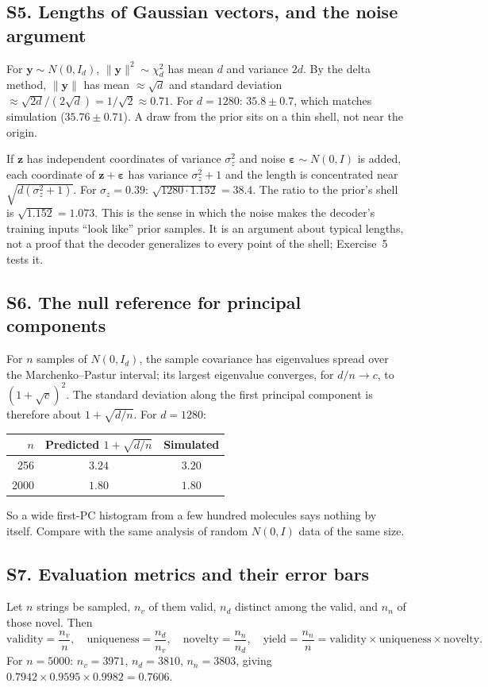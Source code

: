 \documentclass[11pt]{article}
\begin{document}
\subsection*{S5. Lengths of Gaussian vectors, and the noise argument}
For $\bm y\sim N(0,I_d)$, $\lVert\bm y\rVert^2\sim\chi^2_d$ has mean $d$ and variance $2d$. By the delta method, $\lVert\bm y\rVert$ has mean $\approx\sqrt d$ and standard deviation $\approx\sqrt{2d}/(2\sqrt d)=1/\sqrt2\approx0.71$. For $d=1280$: $35.8\pm0.7$, which matches simulation ($35.76\pm0.71$). A draw from the prior sits on a thin shell, not near the origin.

If $\bm z$ has independent coordinates of variance $\sigma_z^2$ and noise $\bm\varepsilon\sim N(0,I)$ is added, each coordinate of $\bm z+\bm\varepsilon$ has variance $\sigma_z^2+1$ and the length is concentrated near $\sqrt{d(\sigma_z^2+1)}$. For $\sigma_z=0.39$: $\sqrt{1280\cdot1.152}=38.4$. The ratio to the prior's shell is $\sqrt{1.152}=1.073$. This is the sense in which the noise makes the decoder's training inputs ``look like'' prior samples. It is an argument about typical lengths, not a proof that the decoder generalizes to every point of the shell; Exercise~5 tests it.

\label{sec:S6}
\subsection*{S6. The null reference for principal components}
For $n$ samples of $N(0,I_d)$, the sample covariance has eigenvalues spread over the Marchenko--Pastur interval; its largest eigenvalue converges, for $d/n\to c$, to $(1+\sqrt c)^2$. The standard deviation along the first principal component is therefore about $1+\sqrt{d/n}$. For $d=1280$:
\begin{center}
\small
\begin{tabular}{@{}rcc@{}}
\toprule
$n$ & Predicted $1+\sqrt{d/n}$ & Simulated\\
\midrule
256 & $3.24$ & $3.20$\\
2000 & $1.80$ & $1.80$\\
\bottomrule
\end{tabular}
\end{center}
So a wide first-PC histogram from a few hundred molecules says nothing by itself. Compare with the same analysis of random $N(0,I)$ data of the same size.

\label{sec:S7}
\subsection*{S7. Evaluation metrics and their error bars}
Let $n$ strings be sampled, $n_v$ of them valid, $n_d$ distinct among the valid, and $n_n$ of those novel. Then
\[
  \text{validity}=\frac{n_v}{n},\quad
  \text{uniqueness}=\frac{n_d}{n_v},\quad
  \text{novelty}=\frac{n_n}{n_d},\quad
  \text{yield}=\frac{n_n}{n}=\text{validity}\times\text{uniqueness}\times\text{novelty}.
\]
For $n=5000$: $n_v=3971$, $n_d=3810$, $n_n=3803$, giving $0.7942\times0.9595\times0.9982=0.7606$.
\end{document}
